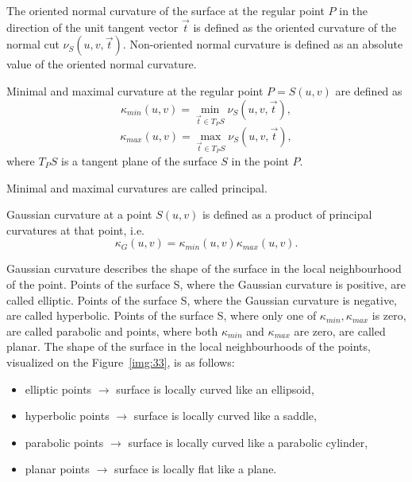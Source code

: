 \begin{definition}
    The oriented normal curvature of the surface at the regular point $P$ in the direction of the unit tangent vector
    $\vec{t}$ is defined as the oriented curvature of the normal cut $\nu_S(u, v, \vec{t})$.
    Non-oriented normal curvature is defined as an absolute value of the oriented normal curvature.
\end{definition}

\begin{definition}
    Minimal and maximal curvature at the regular point $P = S(u,v)$ are defined as
    $$\kappa_{min}(u,v) = \min_{\vec{t} \in T_PS} \nu_S(u, v, \vec{t}),$$
    $$\kappa_{max}(u,v) = \max_{\vec{t} \in T_PS} \nu_S(u, v, \vec{t}),$$
    where $T_PS$ is a tangent plane of the surface $S$ in the point $P$.

    Minimal and maximal curvatures are called principal.
\end{definition}

\begin{definition}
    Gaussian curvature at a point $S(u, v)$ is defined as a product of principal curvatures
    at that point, i.e.
    $$\kappa_G(u, v) = \kappa_{min}(u,v) \kappa_{max}(u,v).$$
\end{definition}

Gaussian curvature describes the shape of the surface in the local neighbourhood of the point.
Points of the surface S, where the Gaussian curvature is positive, are called elliptic.
Points of the surface S, where the Gaussian curvature is negative, are called hyperbolic.
Points of the surface S, where only one of $\kappa_{min}, \kappa_{max}$ is zero, are called
parabolic and points, where both $\kappa_{min}$ and $\kappa_{max}$ are zero, are called planar.
The shape of the surface in the local neighbourhoods of the points, visualized on the
Figure~\ref{img:33}, is as follows:
\begin{itemize}
    \item {elliptic points $\longrightarrow$ surface is locally curved like an ellipsoid,}
    \item {hyperbolic points $\longrightarrow$ surface is locally curved like a saddle,}
    \item {parabolic points $\longrightarrow$ surface is locally curved like a parabolic cylinder,}
    \item {planar points $\longrightarrow$ surface is locally flat like a plane.}
\end{itemize}

